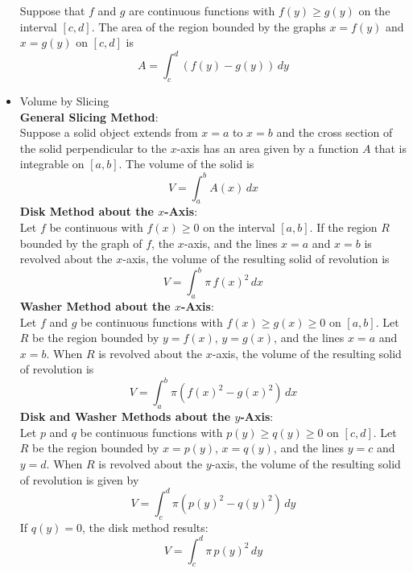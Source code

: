 \documentclass{article}
\begin{document}
\begin{itemize}
        Suppose that $f$ and $g$ are continuous functions with $f(y) \geq g(y)$ on the interval $[c,d]$. The area of the region bounded by the graphs $x = f(y)$ and $x = g(y)$ on $[c,d]$ is
        $$A = \int_c^d{\left(f(y) - g(y)\right)\,dy}$$
    \item Volume by Slicing \\
        \textbf{General Slicing Method}: \\
        Suppose a solid object extends from $x = a$ to $x = b$ and the cross section of the solid perpendicular to the $x$-axis has an area given by a function $A$ that is integrable on $[a,b]$. The volume of the solid is
        $$V = \int_a^b{A(x)\,dx}$$
        \textbf{Disk Method about the $x$-Axis}: \\
        Let $f$ be continuous with $f(x) \geq 0$ on the interval $[a,b]$. If the region $R$ bounded by the graph of $f$, the $x$-axis, and the lines $x = a$ and $x = b$ is revolved about the $x$-axis, the volume of the resulting solid of revolution is
        $$V = \int_a^b{\pi\,f(x)^2\,dx}$$
        \textbf{Washer Method about the $x$-Axis}: \\
        Let $f$ and $g$ be continuous functions with $f(x) \geq g(x) \geq 0$ on $[a,b]$. Let $R$ be the region bounded by $y = f(x)$, $y = g(x)$, and the lines $x = a$ and $x = b$. When $R$ is revolved about the $x$-axis, the volume of the resulting solid of revolution is
        $$V = \int_a^b{\pi\left(f(x)^2 - g(x)^2\right)\,dx}$$
        \textbf{Disk and Washer Methods about the $y$-Axis}: \\
        Let $p$ and $q$ be continuous functions with $p(y) \geq q(y) \geq 0$ on $[c,d]$. Let $R$ be the region bounded by $x = p(y)$, $x = q(y)$, and the lines $y = c$ and $y = d$. When $R$ is revolved about the $y$-axis, the volume of the resulting solid of revolution is given by
        $$V = \int_c^d{\pi\left(p(y)^2 - q(y)^2\right)\,dy}$$
        If $q(y) = 0$, the disk method results:
        $$V = \int_c^d{\pi\,p(y)^2\,dy}$$
\end{itemize}
\end{document}
